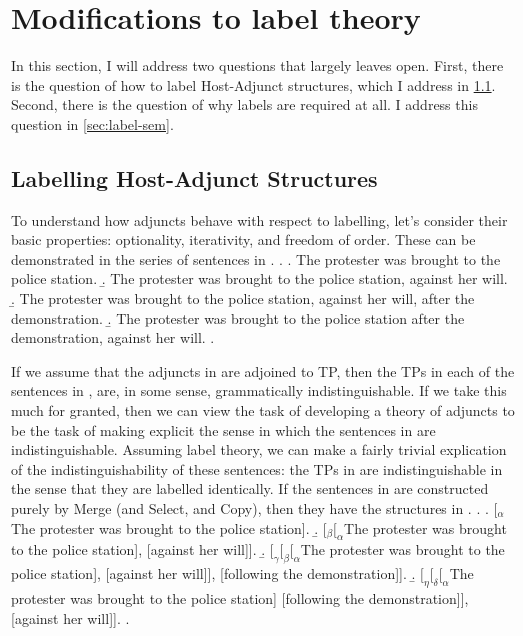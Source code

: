 \documentclass[MilwayThesis]{subfiles}
\begin{document}
\section{Modifications to label theory}\label{sec:modifications}

In this section, I will address two questions that \textcite{chomsky2013problems,chomsky2015problems} largely leaves open.
First, there is the question of how to label Host-Adjunct structures, which I address in \cref{sec:adjuncts}.
Second, there is the question of why labels are required at all.
I address this question in \cref{sec:label-sem}.
%
\subsection{Labelling Host-Adjunct Structures}\label{sec:adjuncts}
To understand how adjuncts behave with respect to labelling, let's consider their basic properties: optionality, iterativity, and freedom of order.
These can be demonstrated in the series of sentences in \Next.
\ex. 
\a. The protester was brought to the police station.
\b. The protester was brought to the police station, against her will.
\b. The protester was brought to the police station, against her will, after the demonstration.
\b. The protester was brought to the police station after the demonstration, against her will.
\z.

If we assume that the adjuncts in \Last are adjoined to TP, then the TPs in each of the sentences in \Last, are, in some sense, grammatically indistinguishable.
If we take this much for granted, then we can view the task of developing a theory of adjuncts to be the task of making explicit the sense in which the sentences in \Last are indistinguishable.
Assuming label theory, we can make a fairly trivial explication of the indistinguishability of these sentences: the TPs in \Last are indistinguishable in the sense that they are labelled identically.
If the sentences in \Last are constructed purely by Merge (and Select, and Copy), then they have the structures in \Next.
\ex.
\a. [$_\alpha$ The protester was brought to the police station].
\b. [$_{\beta} [_{\alpha}$The protester was brought to the police station], [against her will]].
\b. $[_{\gamma}[_{\beta}[_{\alpha}$The protester was brought to the police station], [against her will]], [following the demonstration]].
\b. $[_{\eta} [_{\delta} [_{\alpha}$The protester was brought to the police station] [following the demonstration]], [against her will]].
\z.
\end{document}
